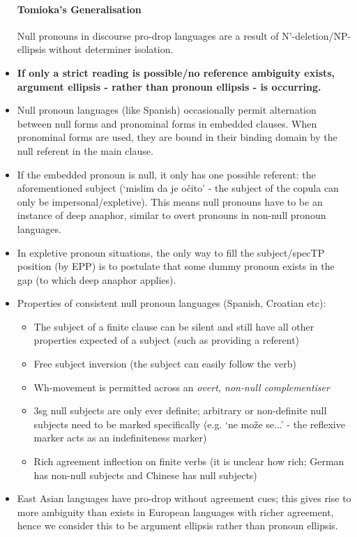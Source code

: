 \documentclass{article}
\begin{document}
\begin{itemize}
    \paragraph{Tomioka's Generalisation} Null pronouns in discourse pro-drop languages are a result of N'-deletion/NP-ellipsis without determiner isolation.
    \item \textbf{If only a strict reading is possible/no reference ambiguity exists, argument ellipsis - rather than pronoun ellipsis - is occurring.}
    \item Null pronoun languages (like Spanish) occasionally permit alternation between null forms and pronominal forms in embedded clauses. When pronominal forms are used, they are bound in their binding domain by the null referent in the main clause.
    \item If the embedded pronoun is null, it only has one possible referent: the aforementioned subject (`mislim da je očito' - the subject of the copula can only be impersonal/expletive). This means null pronouns have to be an instance of deep anaphor, similar to overt pronouns in non-null pronoun languages.
    \item In expletive pronoun situations, the only way to fill the subject/specTP position (by EPP) is to postulate that some dummy pronoun exists in the gap (to which deep anaphor applies).
    \item Properties of consistent null pronoun languages (Spanish, Croatian etc):
    \begin{itemize}
        \item The subject of a finite clause can be silent and still have all other properties expected of a subject (such as providing a referent)
        \item Free subject inversion (the subject can easily follow the verb)
        \item Wh-movement is permitted across an \textit{overt, non-null complementiser}
        \item 3sg null subjects are only ever definite; arbitrary or non-definite null subjects need to be marked specifically (e.g. `ne može se...' - the reflexive marker acts as an indefiniteness marker)
        \item Rich agreement inflection on finite verbs (it is unclear how rich; German has non-null subjects and Chinese has null subjects)
    \end{itemize}
    \item East Asian languages have pro-drop without agreement cues; this gives rise to more ambiguity than exists in European languages with richer agreement, hence we consider this to be argument ellipsis rather than pronoun ellipsis.

\end{itemize}
\end{document}
